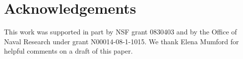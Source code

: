 \documentclass[10pt, conference, compsocconf]{IEEEtran}
\begin{document}
\section*{Acknowledgements}

This work was supported in part by NSF grant
0830403 and by the Office of Naval Research under grant
N00014-08-1-1015. We thank Elena Mumford for helpful comments on a draft of this paper.



\end{document}
